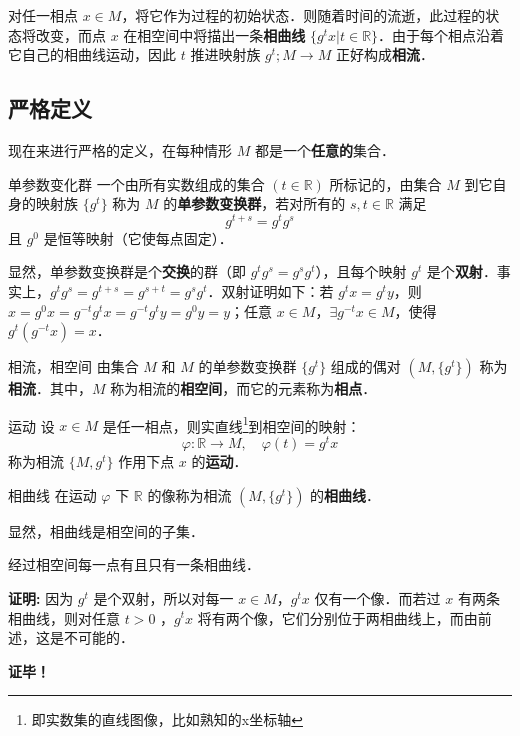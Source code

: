 对任一相点 $x\in M$，将它作为过程的初始状态．则随着时间的流逝，此过程的状态将改变，而点 $x$ 在相空间中将描出一条\textbf{相曲线} $\{g^tx|t\in \mathbb R\}$．由于每个相点沿着它自己的相曲线运动，因此 $t$ 推进映射族 $g^t;M\rightarrow M$ 正好构成\textbf{相流}． 
\subsection{严格定义}
现在来进行严格的定义，在每种情形 $M$ 都是一个\textbf{任意的}集合．
\begin{definition}{单参数变化群}
一个由所有实数组成的集合 $(t\in \mathbb R)$ 所标记的，由集合 $M$ 到它自身的映射族 $\{g^t\}$ 称为 $M$ 的\textbf{单参数变换群}，若对所有的 $s,t\in\mathbb R$ 满足
\begin{equation}
g^{t+s}=g^tg^s
\end{equation}
 且 $g^0$ 是恒等映射（它使每点固定）．
\end{definition}
显然，单参数变换群是个\textbf{交换}的群（即 $g^tg^s=g^sg^t$），且每个映射 $g^t$ 是个\textbf{双射}．事实上，$g^tg^s=g^{t+s}=g^{s+t}=g^sg^t$．双射证明如下：若 $g^t x=g^t y$，则 $x=g^0x=g^{-t}g^tx=g^{-t}g^ty=g^0y=y$；任意 $x\in M$，$\exists g^{-t}x\in M$，使得 $g^t(g^{-t}x)=x$．
\begin{definition}{相流，相空间}
由集合 $M$ 和 $M$ 的单参数变换群 $\{g^t\}$ 组成的偶对 $(M,\{g^t\})$ 称为\textbf{相流}．其中，$M$ 称为相流的\textbf{相空间}，而它的元素称为\textbf{相点}．
\end{definition}
\begin{definition}{运动}
设 $x\in M$ 是任一相点，则实直线\footnote{即实数集的直线图像，比如熟知的x坐标轴}到相空间的映射：
\begin{equation}\label{PSaPF_eq1}
\varphi:\mathbb R\rightarrow M,\quad \varphi(t)=g^tx
\end{equation}
称为相流 $\{M,{g^t}\}$ 作用下点 $x$ 的\textbf{运动}．
\end{definition}
\begin{definition}{相曲线}
在运动 $\varphi$ 下 $\mathbb R$ 的像称为相流 $(M,\{g^t\})$ 的\textbf{相曲线}．
\end{definition}
显然，相曲线是相空间的子集．
\begin{theorem}{}
经过相空间每一点有且只有一条相曲线．
\end{theorem}
\textbf{证明:}
因为 $g^t$ 是个双射，所以对每一 $x\in M$，$g^t x$ 仅有一个像．而若过 $x$ 有两条相曲线，则对任意 $t>0$ ，$g^tx$ 将有两个像，它们分别位于两相曲线上，而由前述，这是不可能的．

\textbf{证毕！}

